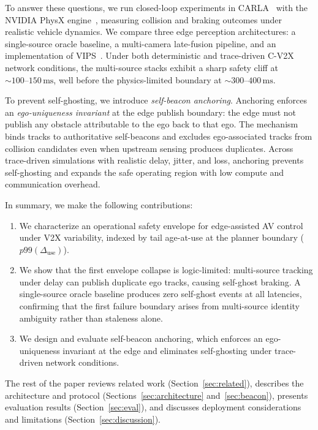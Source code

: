 To answer these questions, we run closed-loop experiments in CARLA~\cite{dosovitskiy_carla_nodate} with the NVIDIA PhysX engine~\cite{NVIDIA_PhysX}, measuring collision and braking outcomes under realistic vehicle dynamics. We compare three edge perception architectures: a single-source oracle baseline, a multi-camera late-fusion pipeline, and an implementation of VIPS~\cite{vips2022}. Under both deterministic and trace-driven C-V2X network conditions, the multi-source stacks exhibit a sharp safety cliff at ${\sim}100\text{--}150\,\mathrm{ms}$, well before the physics-limited boundary at ${\sim}300\text{--}400\,\mathrm{ms}$.

To prevent self-ghosting, we introduce \emph{self-beacon anchoring}.
Anchoring enforces an \emph{ego-uniqueness invariant} at the edge publish boundary: the edge must not publish any obstacle attributable to the ego back to that ego.
The mechanism binds tracks to authoritative self-beacons and excludes ego-associated tracks from collision candidates even when upstream sensing produces duplicates.
Across trace-driven simulations with realistic delay, jitter, and loss, anchoring prevents self-ghosting and expands the safe operating region with low compute and communication overhead.

In summary, we make the following contributions:
\begin{enumerate}[label=\arabic*.,noitemsep,topsep=0pt,leftmargin=1.2\parindent]
    \item We characterize an operational safety envelope for edge-assisted AV control under V2X variability, indexed by tail age-at-use at the planner boundary ($p99(\Delta_{\mathrm{use}})$).
    \item We show that the first envelope collapse is logic-limited: multi-source tracking under delay can publish duplicate ego tracks, causing self-ghost braking. A single-source oracle baseline produces zero self-ghost events at all latencies, confirming that the first failure boundary arises from multi-source identity ambiguity rather than staleness alone.
    \item We design and evaluate self-beacon anchoring, which enforces an ego-uniqueness invariant at the edge and eliminates self-ghosting under trace-driven network conditions.
\end{enumerate}

The rest of the paper reviews related work (Section~\ref{sec:related}), describes the architecture and protocol (Sections~\ref{sec:architecture} and~\ref{sec:beacon}), presents evaluation results (Section~\ref{sec:eval}), and discusses deployment considerations and limitations (Section~\ref{sec:discussion}).